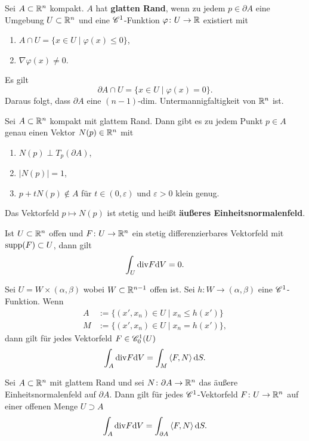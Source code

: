 Sei $A \subset \mathbb{R}^n$ kompakt. $A$ hat \textbf{glatten Rand}, wenn zu jedem $p \in \partial A$ eine Umgebung $U \subset \mathbb{R}^n$ und eine $\mathscr{C}^1$-Funktion $\varphi \colon U \to \mathbb{R}$ existiert mit
\begin{enumerate}[label=(\alph*)]
	\item $A \cap U = \{x \in U \mid \varphi(x) \leq 0\}$,
	\item $\nabla \varphi(x) \neq 0$.
\end{enumerate}
Es gilt
\[\partial A \cap U = \{x \in U \mid \varphi(x) = 0\}.\]
Daraus folgt, dass $\partial A$ eine $(n-1)$-dim. Untermannigfaltigkeit von $\mathbb{R}^n$ ist.
\begin{satz}\label{satz3_13}
	Sei $A \subset \mathbb{R}^n$ kompakt mit glattem Rand. Dann gibt es zu jedem Punkt $p \in A$ genau einen Vektor $N(p) \in \mathbb{R}^n$ mit
	\begin{enumerate}[label=(\alph*)]
		\item $N(p) \perp T_p(\partial A)$,
		\item $|N(p)| = 1$,
		\item $p + t N(p) \notin A$ für $t \in (0,\varepsilon)$ und $\varepsilon > 0$ klein genug.
	\end{enumerate}
\end{satz}
Das Vektorfeld $p \mapsto N(p)$ ist stetig und heißt \textbf{äußeres Einheitsnormalenfeld}.
\begin{lem}\label{lem3_14}
	Ist $U \subset \mathbb{R}^n$ offen und $F \colon U \to \mathbb{R}^n$ ein stetig differenzierbares Vektorfeld mit $\mathrm{supp}(F) \subset U$, dann gilt
	\[\int_U \mathrm{div} F \mathrm{d} V = 0.\]
\end{lem}
\begin{lem}\label{lem3_15}
	Sei $U = W \times (\alpha, \beta)$ wobei $W \subset \mathbb{R}^{n-1}$ offen ist. Sei $h \colon W \to (\alpha, \beta)$ eine $\mathscr{C}^1$-Funktion. Wenn 
	\begin{align*}
		A &:= \{(x', x_n) \in U \mid x_n \leq h(x')\}\\
		M &:= \{(x', x_n) \in U \mid x_n = h(x')\},
	\end{align*}
	dann gilt für jedes Vektorfeld $F \in \mathscr{C}_0^1 (U)$
	\[\int_A \mathrm{div} F \mathrm{d} V = \int_M \left\langle F,N \right\rangle \mathrm{d} S.\]
\end{lem}
\begin{thm}\label{thm3_16}
	Sei $A \subset \mathbb{R}^n$ mit glattem Rand und sei $N \colon \partial A \to \mathbb{R}^n$ das äußere Einheitsnormalenfeld auf $\partial A$. Dann gilt für jedes $\mathscr{C}^1$-Vektorfeld $F \colon U \to \mathbb{R}^n$ auf einer offenen Menge $U \supset A$
	\[\int_A \mathrm{div} F \mathrm{d} V = \int_{\partial A} \left\langle F,N \right\rangle \mathrm{d} S.\]
\end{thm}
